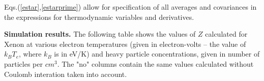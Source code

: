 Eqs.(\ref{estar},\ref{estarprime}) allow for specification of all averages and covariances in the 
expressions for thermodynamic variables and derivatives.

{\bf Simulation results.}
The following table shows the values of $Z$ calculated for Xenon
at various electron temperatures
(given in electron-volts -- the value of $k_{B}T_{e}$, where $k_{B}$
is in eV/K) and heavy particle concentrations, given in number of
particles per $cm^{3}$. The "no" columns contain the same values
calculated without Coulomb interation taken into account.

\begin{center}

\par\end{center}

\clearpage
